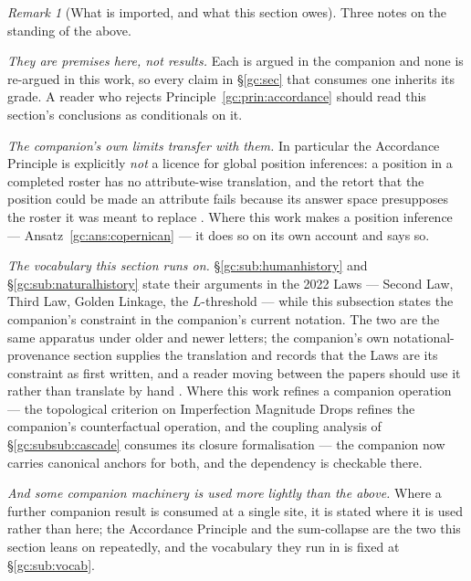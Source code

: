\documentclass[11pt]{article}
\numberwithin{equation}{section}
\theoremstyle{plain}
\theoremstyle{definition}
\theoremstyle{remark}
\newtheorem{remark}[theorem]{Remark}
\begin{document}
\begin{remark}[What is imported, and what this section owes]
\label{gc:rem:importscope}
Three notes on the standing of the above.

\emph{They are premises here, not results.} Each is argued in the
companion and none is re-argued in this work, so every claim in
\S\ref{gc:sec} that consumes one inherits its grade. A reader who
rejects Principle~\ref{gc:prin:accordance} should read this section's
conclusions as conditionals on it.

\emph{The companion's own limits transfer with them.} In particular the
Accordance Principle is explicitly \emph{not} a licence for global
position inferences: a position in a completed roster has no
attribute-wise translation, and the retort that the position could be
made an attribute fails because its answer space presupposes the roster
it was meant to replace \cite{NexicFoundation}. Where this work makes a
position inference --- Ansatz~\ref{gc:ans:copernican} --- it does so on
its own account and says so.

\emph{The vocabulary this section runs on.} \S\ref{gc:sub:humanhistory}
and \S\ref{gc:sub:naturalhistory} state their arguments in the 2022 Laws
--- Second Law, Third Law, Golden Linkage, the $L$-threshold --- while
this subsection states the companion's constraint in the companion's
current notation. The two are the same apparatus under older and newer
letters; the companion's own notational-provenance section supplies the
translation and records that the Laws are its constraint as first
written, and a reader moving between the papers should use it rather than
translate by hand \cite{Nexus}. Where this work refines a companion
operation --- the topological criterion on Imperfection Magnitude Drops
refines the companion's counterfactual operation, and the coupling
analysis of \S\ref{gc:subsub:cascade} consumes its closure formalisation
--- the companion now carries canonical anchors for both, and the
dependency is checkable there.

\emph{And some companion machinery is used more lightly than the above.}
Where a further companion result is consumed at a single site, it is
stated where it is used rather than here; the Accordance Principle and the
sum-collapse are the two this section leans on repeatedly, and the
vocabulary they run in is fixed at \S\ref{gc:sub:vocab}.
\end{remark}



\end{document}
